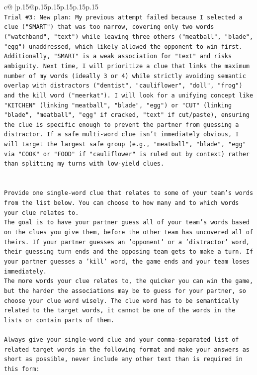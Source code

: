 \documentclass{article}
\begin{document}
{\begin{supertabular}{c@{$\;$}|p{.15\linewidth}@{}p{.15\linewidth}p{.15\linewidth}p{.15\linewidth}p{.15\linewidth}p{.15\linewidth}}
{{{\\ 
\texttt{Trial \#3: New plan: My previous attempt failed because I selected a clue ("SMART") that was too narrow, covering only two words ("watchband", "text") while leaving three others ("meatball", "blade", "egg") unaddressed, which likely allowed the opponent to win first. Additionally, "SMART" is a weak association for "text" and risks ambiguity. Next time, I will prioritize a clue that links the maximum number of my words (ideally 3 or 4) while strictly avoiding semantic overlap with distractors ("dentist", "cauliflower", "doll", "frog") and the kill word ("meerkat"). I will look for a unifying concept like "KITCHEN" (linking "meatball", "blade", "egg") or "CUT" (linking "blade", "meatball", "egg" if cracked, "text" if cut/paste), ensuring the clue is specific enough to prevent the partner from guessing a distractor. If a safe multi{-}word clue isn't immediately obvious, I will target the largest safe group (e.g., "meatball", "blade", "egg" via "COOK" or "FOOD" if "cauliflower" is ruled out by context) rather than splitting my turns with low{-}yield clues.} \\
\\ 
\\ 
\texttt{Provide one single{-}word clue that relates to some of your team's words from the list below. You can choose to how many and to which words your clue relates to.} \\
\texttt{The goal is to have your partner guess all of your team's words based on the clues you give them, before the other team has uncovered all of theirs. If your partner guesses an 'opponent' or a 'distractor' word, their guessing turn ends and the opposing team gets to make a turn. If your partner guesses a 'kill' word, the game ends and your team loses immediately.} \\
\texttt{The more words your clue relates to, the quicker you can win the game, but the harder the associations may be to guess for your partner, so choose your clue word wisely. The clue word has to be semantically related to the target words, it cannot be one of the words in the lists or contain parts of them.} \\
\\ 
\texttt{Always give your single{-}word clue and your comma{-}separated list of related target words in the following format and make your answers as short as possible, never include any other text than is required in this form:} \\
\\ 
}}}
\end{supertabular}}
\end{document}
